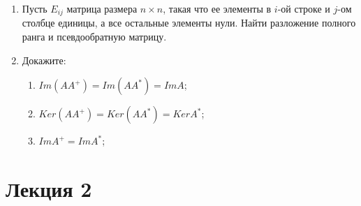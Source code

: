 \documentclass[12pt]{article}
\begin{document}
\begin{enumerate}
		\item Пусть $E_{ij}$ матрица размера $n\times n$, такая что ее элементы в $i$-ой строке и $j$-ом столбце единицы, а все остальные элементы нули. Найти разложение полного ранга и псевдообратную матрицу.
		\item Докажите:\begin{enumerate}
			\item $Im(AA^+) = Im(AA^*) = Im A$;
			\item $Ker (AA^+) = Ker (AA^*) = Ker A^*$;
			\item $Im A^+ = Im A^*$;
		\end{enumerate}
	\end{enumerate}
	
	\newpage
	\section{Лекция 2}
\end{document}
